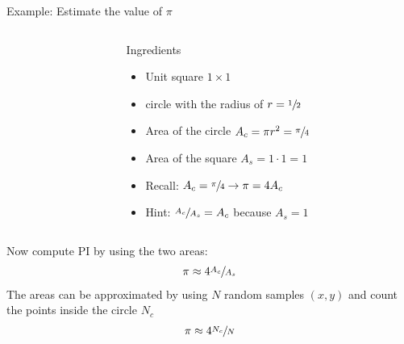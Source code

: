 \documentclass[12pt]{beamer}
\begin{document}
\begin{frame}{Example: Estimate the value of $\pi$}

\begin{columns}

\begin{column}{0.3\textwidth}
\centering
{}
\end{column}
\begin{column}{0.7\textwidth}
\begin{block}{Ingredients}
\begin{itemize}
\item Unit square $1\times 1$ 
\item circle with the radius of $r=\sfrac{1}{2}$
\item Area of the circle $A_c=\pi r^2 = \sfrac{\pi}{4} $ 
\item Area of the square $A_s = 1 \cdot 1 = 1$
\item Recall: $A_c=\sfrac{\pi}{4}\rightarrow \pi = 4A_c$
\item Hint:   $\sfrac{A_c}{A_s} = A_c$ because $A_s=1$
\end{itemize}
\end{block}
\end{column}
\end{columns}
Now compute PI by using the two areas:
\begin{align*}
\pi \approx 4 \sfrac{A_c}{A_s}
\end{align*}
The areas can be approximated by using $N$ random samples $(x,y)$ and count the points inside the circle $N_c$ 
\begin{align*}
\pi \approx 4 \sfrac{N_c}{N}
\end{align*}
\end{frame}
\end{document}
